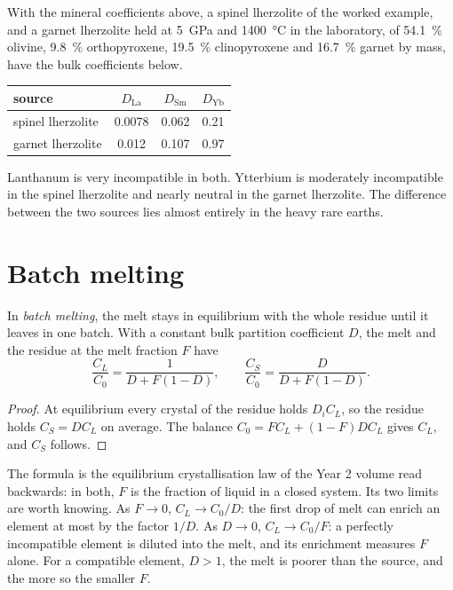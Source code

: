 With the mineral coefficients above, a spinel lherzolite of the worked
example, and a garnet lherzolite held at \qty{5}{GPa} and
\qty{1400}{\celsius} in the laboratory, of \qty{54.1}{\percent} olivine,
\qty{9.8}{\percent} orthopyroxene, \qty{19.5}{\percent} clinopyroxene and
\qty{16.7}{\percent} garnet by mass, have the bulk coefficients below.
\begin{center}
\small
\begin{tabular}{lccc}
\hline
source & $D_{\mathrm{La}}$ & $D_{\mathrm{Sm}}$ & $D_{\mathrm{Yb}}$ \\
\hline
spinel lherzolite & 0.0078 & 0.062 & 0.21 \\
garnet lherzolite & 0.012 & 0.107 & 0.97 \\
\hline
\end{tabular}
\end{center}
Lanthanum is very incompatible in both. Ytterbium is moderately incompatible
in the spinel lherzolite and nearly neutral in the garnet lherzolite. The
difference between the two sources lies almost entirely in the heavy rare
earths.

\section{Batch melting}\label{sec:b3:trace-element-modelling:batch}

\begin{theorem}\label{thm:b3:trace-element-modelling:batch}
In \emph{batch melting}, the melt stays in equilibrium
with the whole residue until it leaves in one batch. With a constant bulk
partition coefficient $D$, the melt and the residue at the melt fraction $F$
have
\[
\frac{C_L}{C_0} = \frac{1}{D + F(1 - D)}, \qquad
\frac{C_S}{C_0} = \frac{D}{D + F(1 - D)}.
\]
\end{theorem}

\begin{proof}
At equilibrium every crystal of the residue holds $D_iC_L$, so the residue
holds $C_S = DC_L$ on average. The balance $C_0 = FC_L + (1 - F)DC_L$ gives
$C_L$, and $C_S$ follows.
\end{proof}

The formula is the equilibrium crystallisation law of the Year 2 volume read
backwards: in both, $F$ is the fraction of liquid in a closed system. Its two
limits are worth knowing. As $F \to 0$, $C_L \to C_0/D$: the first drop of melt
can enrich an element at most by the factor $1/D$. As $D \to 0$, $C_L \to
C_0/F$: a perfectly incompatible element is diluted into the melt, and its
enrichment measures $F$ alone. For a compatible element, $D > 1$, the melt is
poorer than the source, and the more so the smaller $F$.

